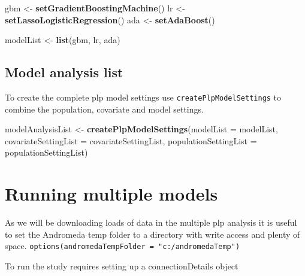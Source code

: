 \documentclass[
]{article}
\newenvironment{Shaded}{\begin{snugshade}}{\end{snugshade}}
\newcommand{\DataTypeTok}[1]{\textcolor[rgb]{0.13,0.29,0.53}{#1}}
\newcommand{\KeywordTok}[1]{\textcolor[rgb]{0.13,0.29,0.53}{\textbf{#1}}}
\newcommand{\NormalTok}[1]{#1}
\newcommand{\StringTok}[1]{\textcolor[rgb]{0.31,0.60,0.02}{#1}}
\begin{document}
\begin{Shaded}
\begin{Highlighting}[]
\NormalTok{gbm <-}\StringTok{ }\KeywordTok{setGradientBoostingMachine}\NormalTok{()}
\NormalTok{lr <-}\StringTok{ }\KeywordTok{setLassoLogisticRegression}\NormalTok{()}
\NormalTok{ada <-}\StringTok{ }\KeywordTok{setAdaBoost}\NormalTok{()}

\NormalTok{modelList <-}\StringTok{ }\KeywordTok{list}\NormalTok{(gbm, lr, ada)}
\end{Highlighting}
\end{Shaded}

\hypertarget{model-analysis-list}{%
\subsection{Model analysis list}\label{model-analysis-list}}

To create the complete plp model settings use
\texttt{createPlpModelSettings} to combine the population, covariate and
model settings.

\begin{Shaded}
\begin{Highlighting}[]
\NormalTok{modelAnalysisList <-}\StringTok{ }\KeywordTok{createPlpModelSettings}\NormalTok{(}\DataTypeTok{modelList =}\NormalTok{ modelList, }
                                   \DataTypeTok{covariateSettingList =}\NormalTok{ covariateSettingList,}
                                   \DataTypeTok{populationSettingList =}\NormalTok{ populationSettingList)}
\end{Highlighting}
\end{Shaded}

\hypertarget{running-multiple-models}{%
\section{Running multiple models}\label{running-multiple-models}}

As we will be downloading loads of data in the multiple plp analysis it
is useful to set the Andromeda temp folder to a directory with write
access and plenty of space.
\texttt{options(andromedaTempFolder\ =\ "c:/andromedaTemp")}

To run the study requires setting up a connectionDetails object
\end{document}
